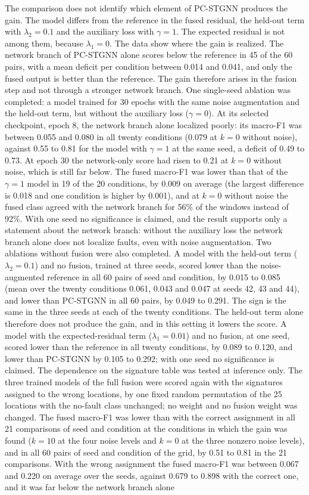\documentclass[MTech]{ugthesis}
\begin{document}
The comparison does not identify which element of \ac{PC-STGNN} produces the gain. The model differs from the reference in the fused residual, the held-out term with $\lambda_2=0.1$ and the auxiliary loss with $\gamma=1$. The expected residual is not among them, because $\lambda_1=0$. The data show where the gain is realized. The network branch of \ac{PC-STGNN} alone scores below the reference in 45 of the 60 pairs, with a mean deficit per condition between 0.014 and 0.041, and only the fused output is better than the reference. The gain therefore arises in the fusion step and not through a stronger network branch. One single-seed ablation was completed: a model trained for 30 epochs with the same noise augmentation and the held-out term, but without the auxiliary loss ($\gamma=0$). At its selected checkpoint, epoch 8, the network branch alone localized poorly: its macro-F1 was between 0.055 and 0.080 in all twenty conditions (0.079 at $k=0$ without noise), against 0.55 to 0.81 for the model with $\gamma=1$ at the same seed, a deficit of 0.49 to 0.73. At epoch 30 the network-only score had risen to 0.21 at $k=0$ without noise, which is still far below. The fused macro-F1 was lower than that of the $\gamma=1$ model in 19 of the 20 conditions, by 0.009 on average (the largest difference is 0.018 and one condition is higher by 0.001), and at $k=0$ without noise the fused class agreed with the network branch for 56\% of the windows instead of 92\%. With one seed no significance is claimed, and the result supports only a statement about the network branch: without the auxiliary loss the network branch alone does not localize faults, even with noise augmentation. Two ablations without fusion were also completed. A model with the held-out term ($\lambda_2=0.1$) and no fusion, trained at three seeds, scored lower than the noise-augmented reference in all 60 pairs of seed and condition, by 0.015 to 0.085 (mean over the twenty conditions 0.061, 0.043 and 0.047 at seeds 42, 43 and 44), and lower than \ac{PC-STGNN} in all 60 pairs, by 0.049 to 0.291. The sign is the same in the three seeds at each of the twenty conditions. The held-out term alone therefore does not produce the gain, and in this setting it lowers the score. A model with the expected-residual term ($\lambda_1=0.01$) and no fusion, at one seed, scored lower than the reference in all twenty conditions, by 0.089 to 0.120, and lower than \ac{PC-STGNN} by 0.105 to 0.292; with one seed no significance is claimed. The dependence on the signature table was tested at inference only. The three trained models of the full fusion were scored again with the signatures assigned to the wrong locations, by one fixed random permutation of the 25 locations with the no-fault class unchanged; no weight and no fusion weight was changed. The fused macro-F1 was lower than with the correct assignment in all 21 comparisons of seed and condition at the conditions in which the gain was found ($k=10$ at the four noise levels and $k=0$ at the three nonzero noise levels), and in all 60 pairs of seed and condition of the grid, by 0.51 to 0.81 in the 21 comparisons. With the wrong assignment the fused macro-F1 was between 0.067 and 0.220 on average over the seeds, against 0.679 to 0.898 with the correct one, and it was far below the network branch alone 
\end{document}
